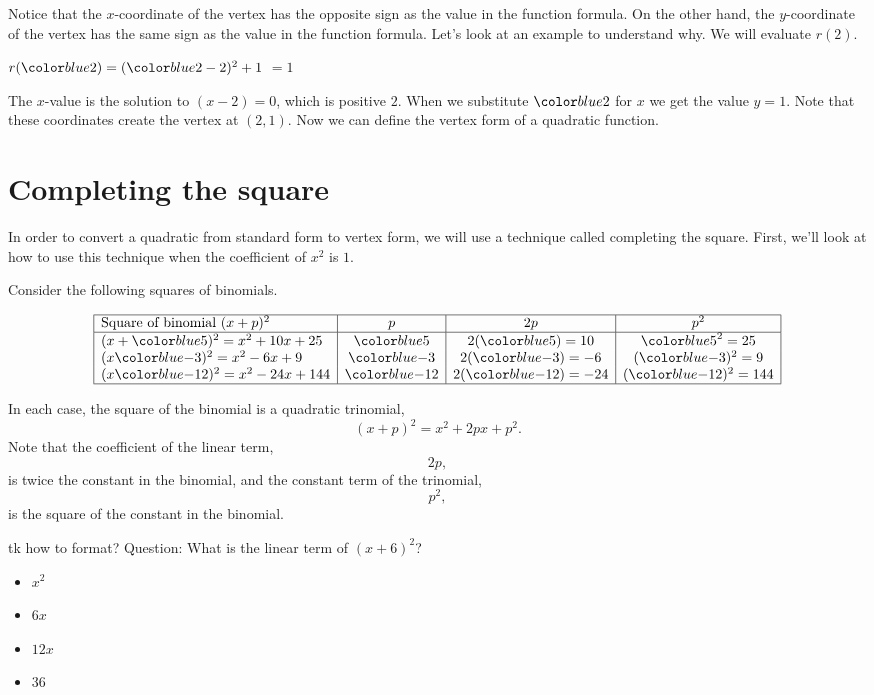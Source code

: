 \documentclass{ximera}
\begin{document}
      Notice that the $x$-coordinate of the vertex has the opposite sign as the value in the function formula.
      On the other hand,
      the $y$-coordinate of the vertex has the same sign as the value in the function formula.
      Let's look at an example to understand why.
      We will evaluate $r(2)$.

        $r(\substitute{2})=(\substitute{2}-2)^2+1$
        $=1$

      The $x$-value is the solution to $(x-2)=0$,
      which is positive $2$.
      When we substitute $\substitute{2}$ for $x$ we get the value $y=1$.
      Note that these coordinates create the vertex at $(2,1)$.
      Now we can define the vertex form of a quadratic function.

\section{Completing the square}

In order to convert a quadratic from standard form to vertex form, we will use a technique called completing the square. First, we'll look at how to use this technique when the coefficient of $x^2$ is $1$.


Consider the following squares of binomials.


\[
 \begin{array}{|l|c|c|c|}
 \hline
 \text{Square of binomial } (x+p)^2 & p & 2p & p^2\\
 \hline
 (x+\substitute{5})^2 = x^2 + 10x + 25 & \substitute{5} & 2(\substitute{5}) = 10 & \substitute{5}^2 = 25 \\
 (x\substitute{-3})^2 = x^2 - 6x + 9 & \substitute{-3} & 2(\substitute{-3}) = -6 & (\substitute{-3})^2 = 9 \\
 (x\substitute{-12})^2 = x^2 -24 x + 144 & \substitute{-12} & 2(\substitute{-12}) = -24 & (\substitute{-12})^2 = 144 \\
 \hline
\end{array}
\]

In each case, the square of the binomial is a quadratic trinomial,
$$
    (x+p)^2 = x^2 + 2px + p^2.
$$
Note that the coefficient of the linear term, 
$$
    2p,
$$
is twice the constant in the binomial, and the constant term of the trinomial, 
$$
    p^2,
$$
is the square of the constant in the binomial.
   
   
tk how to format?
Question: What is the linear term of $(x+6)^2$?
\begin{itemize}
    \item $x^2$
    \item $6x$  
    \item $12x$
    \item $36$
\end{itemize}
\end{document}
